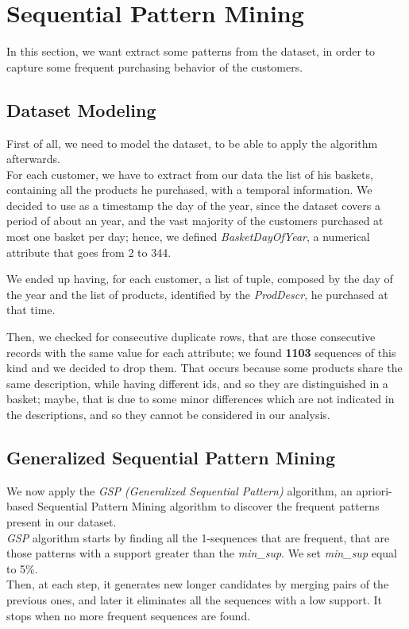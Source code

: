 \section{Sequential Pattern Mining}
In this section, we want extract some patterns from the dataset, in order to capture some frequent purchasing behavior of the customers. 

\subsection{Dataset Modeling}
First of all, we need to model the dataset, to be able to apply the algorithm afterwards.\\
For each customer, we have to extract from our data the list of his baskets, containing all the products he purchased, with a temporal information. 
We decided to use as a timestamp the day of the year, since the dataset covers a period of about an year, and the vast majority of the customers purchased at most one basket per day; hence, we defined \emph{BasketDayOfYear}, a numerical attribute that goes from 2 to 344.

We ended up having, for each customer, a list of tuple, composed by the day of the year and the list of products, identified by the \emph{ProdDescr}, he purchased at that time.

Then, we checked for consecutive duplicate rows, that are those consecutive records with the same value for each attribute; we found \textbf{1103} sequences of this kind and we decided to drop them.
That occurs because some products share the same description, while having different ids, and so they are distinguished in a basket; maybe, that is due to some minor differences which are not indicated in the descriptions, and so they cannot be considered in our analysis.

\subsection{Generalized Sequential Pattern Mining}
We now apply the \emph{GSP (Generalized Sequential Pattern)} algorithm, an apriori-based Sequential Pattern Mining algorithm to discover the frequent patterns present in our dataset.\\
\emph{GSP} algorithm starts by finding all the 1-sequences that are frequent, that are those patterns with a support greater than the \emph{min\_sup}. We set \emph{min\_sup} equal to 5\%.\\
Then, at each step, it generates new longer candidates by merging pairs of the previous ones, and later it eliminates all the sequences with a low support. It stops when no more frequent sequences are found.

